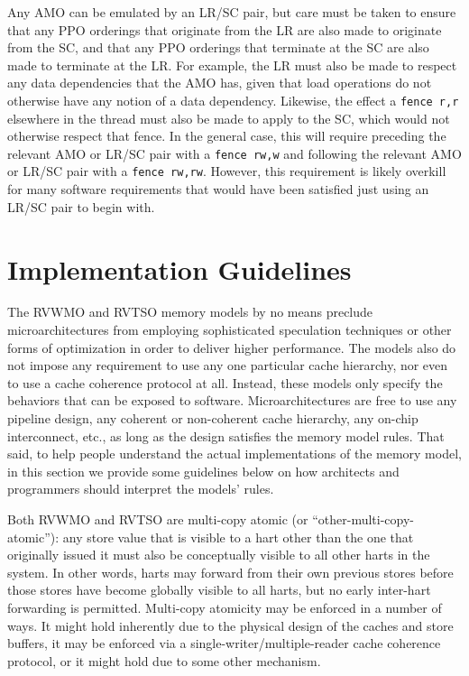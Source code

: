 Any AMO can be emulated by an LR/SC pair, but care must be taken to ensure that any PPO orderings that originate from the LR are also made to originate from the SC, and that any PPO orderings that terminate at the SC are also made to terminate at the LR.
For example, the LR must also be made to respect any data dependencies that the AMO has, given that load operations do not otherwise have any notion of a data dependency.
Likewise, the effect a {\tt fence r,r} elsewhere in the thread must also be made to apply to the SC, which would not otherwise respect that fence.
In the general case, this will require preceding the relevant AMO or LR/SC pair with a {\tt fence rw,w} and following the relevant AMO or LR/SC pair with a {\tt fence rw,rw}.
However, this requirement is likely overkill for many software requirements that would have been satisfied just using an LR/SC pair to begin with.

\section{Implementation Guidelines}

The RVWMO and RVTSO memory models by no means preclude microarchitectures from employing sophisticated speculation techniques or other forms of optimization in order to deliver higher performance.
The models also do not impose any requirement to use any one particular cache hierarchy, nor even to use a cache coherence protocol at all.
Instead, these models only specify the behaviors that can be exposed to software.
Microarchitectures are free to use any pipeline design, any coherent or non-coherent cache hierarchy, any on-chip interconnect, etc., as long as the design satisfies the memory model rules.
That said, to help people understand the actual implementations of the memory model, in this section we provide some guidelines below on how architects and programmers should interpret the models' rules.

Both RVWMO and RVTSO are multi-copy atomic (or ``other-multi-copy-atomic''): any store value that is visible to a hart other than the one that originally issued it must also be conceptually visible to all other harts in the system.
In other words, harts may forward from their own previous stores before those stores have become globally visible to all harts, but no early inter-hart forwarding is permitted.
Multi-copy atomicity may be enforced in a number of ways.
It might hold inherently due to the physical design of the caches and store buffers, it may be enforced via a single-writer/multiple-reader cache coherence protocol, or it might hold due to some other mechanism.

